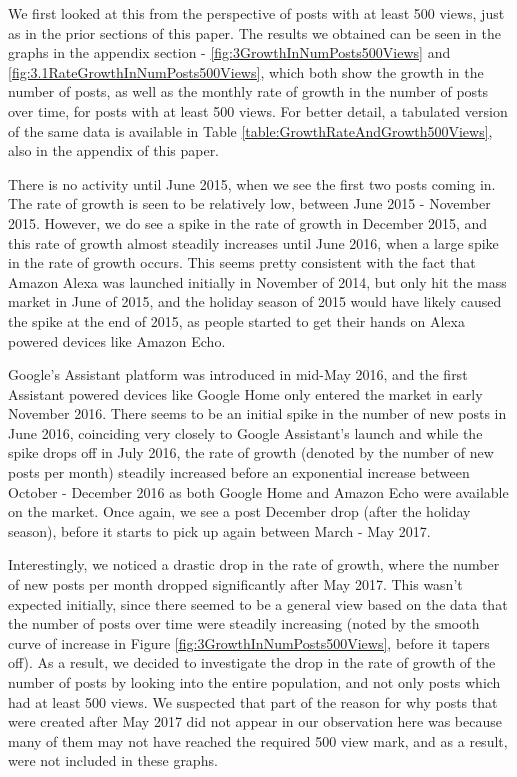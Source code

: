 \documentclass{sigchi}
\begin{document}
We first looked at this from the perspective of posts with at least 500 views, just as in the prior sections of this paper. The results we obtained can be seen in the graphs in the appendix section - \ref{fig:3GrowthInNumPosts500Views} and \ref{fig:3.1RateGrowthInNumPosts500Views}, which both show the growth in the number of posts, as well as the monthly rate of growth in the number of posts over time, for posts with at least 500 views. For better detail, a tabulated version of the same data is available in Table \ref{table:GrowthRateAndGrowth500Views}, also in the appendix of this paper.

There is no activity until June 2015, when we see the first two posts coming in. The rate of growth is seen to be relatively low, between June 2015 - November 2015. However, we do see a spike in the rate of growth in December 2015, and this rate of growth almost steadily increases until June 2016, when a large spike in the rate of growth occurs. This seems pretty consistent with the fact that Amazon Alexa was launched initially in November of 2014, but only hit the mass market in June of 2015, and the holiday season of 2015 would have likely caused the spike at the end of 2015, as people started to get their hands on Alexa powered devices like Amazon Echo.

Google's Assistant platform was introduced in mid-May 2016, and the first Assistant powered devices like Google Home only entered the market in early November 2016. There seems to be an initial spike in the number of new posts in June 2016, coinciding very closely to Google Assistant's launch and while the spike drops off in July 2016, the rate of growth (denoted by the number of new posts per month) steadily increased before an exponential increase between October - December 2016 as both Google Home and Amazon Echo were available on the market. Once again, we see a post December drop (after the holiday season), before it starts to pick up again between March - May 2017. 

Interestingly, we noticed a drastic drop in the rate of growth, where the number of new posts per month dropped significantly after May 2017. This wasn't expected initially, since there seemed to be a general view based on the data that the number of posts over time were steadily increasing (noted by the smooth curve of increase in Figure \ref{fig:3GrowthInNumPosts500Views}, before it tapers off). As a result, we decided to investigate the drop in the rate of growth of the number of posts by looking into the entire population, and not only posts which had at least 500 views. We suspected that part of the reason for why posts that were created after May 2017 did not appear in our observation here was because many of them may not have reached the required 500 view mark, and as a result, were not included in these graphs.
\end{document}
